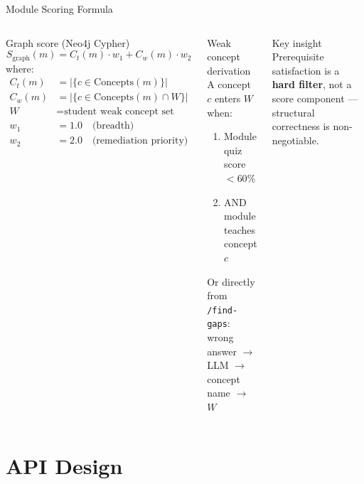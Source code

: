 \documentclass[aspectratio=169,12pt]{beamer}
\begin{document}
\begin{frame}{Module Scoring Formula}
  \begin{columns}
      \begin{block}{Graph score (Neo4j Cypher)}
        \[
          S_{\text{graph}}(m) = C_t(m) \cdot w_1 + C_w(m) \cdot w_2
        \]
        where:
        \begin{align*}
          C_t(m) &= |\{c \in \text{Concepts}(m)\}| \\
          C_w(m) &= |\{c \in \text{Concepts}(m) \cap W\}| \\
          W      &= \text{student weak concept set} \\
          w_1    &= 1.0 \quad \text{(breadth)} \\
          w_2    &= 2.0 \quad \text{(remediation priority)}
        \end{align*}
      \end{block}
      \begin{block}{Weak concept derivation}
        \small
        A concept $c$ enters $W$ when:
        \begin{enumerate}
          \item Module quiz score $< 60\%$
          \item AND module teaches concept $c$
        \end{enumerate}
        \vspace{4pt}
        Or directly from \texttt{/find-gaps}:\\
        wrong answer $\to$ LLM $\to$ concept name $\to$ $W$
      \end{block}
      \vspace{6pt}
      \begin{alertblock}{Key insight}
        \small Prerequisite satisfaction is a \textbf{hard filter}, not a score component — structural correctness is non-negotiable.
      \end{alertblock}
  \end{columns}
\end{frame}

\section{API Design}
\end{document}
